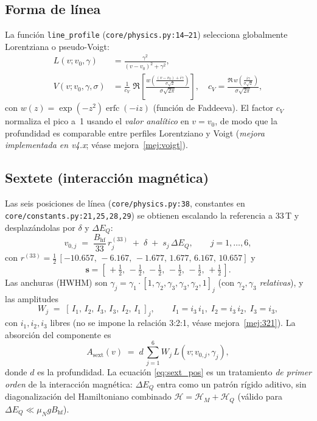 \documentclass[11pt,a4paper]{article}
\newcommand{\BHF}{B_{\mathrm{hf}}}
\newcommand{\dEQ}{\Delta E_{Q}}
\newcommand{\code}[1]{\texttt{\small #1}}
\newcommand{\file}[1]{\textcolor{black!70}{\texttt{\small #1}}}
\begin{document}
\subsection{Forma de línea}
La función \code{line\_profile} (\file{core/physics.py:14--21}) selecciona globalmente Lorentziana o pseudo-Voigt:
\begin{align}
  L(v;v_0,\gamma) &= \frac{\gamma^{2}}{(v-v_0)^{2}+\gamma^{2}}, \label{eq:lorentz}\\
  V(v;v_0,\gamma,\sigma) &= \frac{1}{c_V}\;\Re\!\left[\frac{w\!\left(\frac{(v-v_0)+i\gamma}{\sigma\sqrt 2}\right)}{\sigma\sqrt{2\pi}}\right], \quad c_V = \frac{\Re\,w\!\left(\frac{i\gamma}{\sigma\sqrt 2}\right)}{\sigma\sqrt{2\pi}}, \label{eq:voigt}
\end{align}
con $w(z)=\exp(-z^{2})\operatorname{erfc}(-iz)$ (función de Faddeeva). El factor $c_V$ normaliza el pico a~1 usando el \emph{valor analítico} en $v=v_0$, de modo que la profundidad es comparable entre perfiles Lorentziano y Voigt (\emph{mejora implementada en v4.x}; véase mejora~\ref{mej:voigt}).

\subsection{Sextete (interacción magnética)}\label{sec:sextet}
Las seis posiciones de línea (\file{core/physics.py:38}, constantes en \file{core/constants.py:21,25,28,29}) se obtienen escalando la referencia a 33\,T y desplazándolas por $\delta$ y $\dEQ$:
\begin{equation}
  v_{0,j} \;=\; \frac{\BHF}{33}\,r_j^{(33)} \;+\; \delta \;+\; s_j\,\dEQ,
  \qquad j=1,\dots,6,
  \label{eq:sext_pos}
\end{equation}
con $r^{(33)}=\tfrac12\,[-10.657,\,-6.167,\,-1.677,\,1.677,\,6.167,\,10.657]$ y
\begin{equation}
  \bm s = [\,+\tfrac12,\,-\tfrac12,\,-\tfrac12,\,-\tfrac12,\,-\tfrac12,\,+\tfrac12\,].
\end{equation}
Las anchuras (HWHM) son $\gamma_j = \gamma_1\cdot[1,\gamma_2,\gamma_3,\gamma_3,\gamma_2,1]_j$ (con $\gamma_2,\gamma_3$ \emph{relativas}), y las amplitudes
\begin{equation}
  W_j \;=\; [\,I_1,\,I_2,\,I_3,\,I_3,\,I_2,\,I_1\,]_j,
  \qquad
  I_1 = i_3\,i_1,\; I_2 = i_3\,i_2,\; I_3 = i_3,
\end{equation}
con $i_1,i_2,i_3$ libres (no se impone la relación 3:2:1, véase mejora~\ref{mej:321}). La absorción del componente es
\begin{equation}
  A_{\text{sext}}(v) \;=\; d\,\sum_{j=1}^{6} W_j\, L(v;v_{0,j},\gamma_j),
  \label{eq:Asext}
\end{equation}
donde $d$ es la profundidad. La ecuación \eqref{eq:sext_pos} es un tratamiento \emph{de primer orden} de la interacción magnética: $\dEQ$ entra como un patrón rígido aditivo, sin diagonalización del Hamiltoniano combinado $\mathcal H = \mathcal H_{M}+\mathcal H_{Q}$ (válido para $\dEQ\ll \mu_N g \BHF$).
\end{document}
